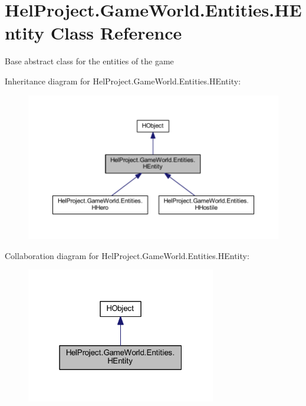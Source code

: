\hypertarget{class_hel_project_1_1_game_world_1_1_entities_1_1_h_entity}{}\section{Hel\+Project.\+Game\+World.\+Entities.\+H\+Entity Class Reference}
\label{class_hel_project_1_1_game_world_1_1_entities_1_1_h_entity}


Base abstract class for the entities of the game  




Inheritance diagram for Hel\+Project.\+Game\+World.\+Entities.\+H\+Entity\+:
\nopagebreak
\begin{figure}[H]
\begin{center}
\leavevmode
\includegraphics[width=350pt]{class_hel_project_1_1_game_world_1_1_entities_1_1_h_entity__inherit__graph}
\end{center}
\end{figure}


Collaboration diagram for Hel\+Project.\+Game\+World.\+Entities.\+H\+Entity\+:\nopagebreak
\begin{figure}[H]
\begin{center}
\leavevmode
\includegraphics[width=235pt]{class_hel_project_1_1_game_world_1_1_entities_1_1_h_entity__coll__graph}
\end{center}
\end{figure}
